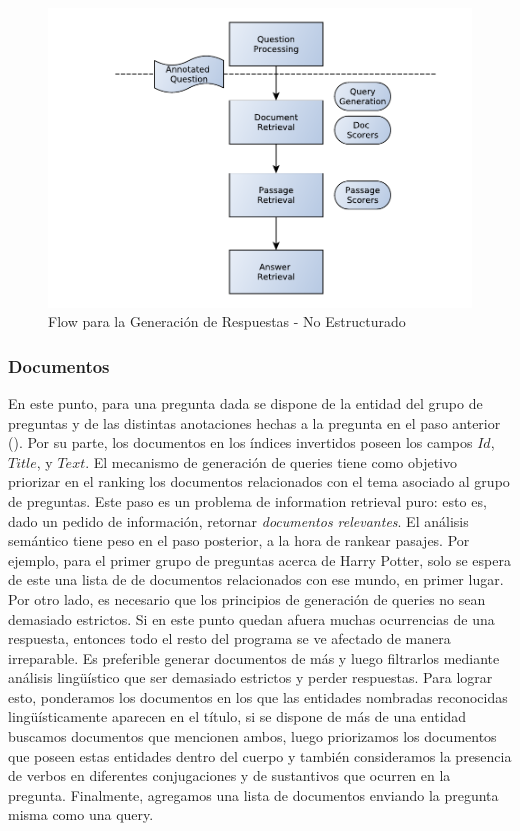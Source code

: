 \begin{figure}[H]
  \centering
    \includegraphics[scale=0.75]{graficos/AnswerRetrievalFlowWiki}
  \caption{Flow para la Generación de Respuestas - No Estructurado}
  \label{fig:AnswerRetrievalFlowWiki}
\end{figure}

\subsubsection{Documentos}
\label{subsec:docs}
En este punto, para una pregunta dada se dispone de la entidad del grupo de preguntas y de las distintas anotaciones hechas a la pregunta en el paso anterior (). Por su parte, los documentos en los índices invertidos poseen los campos $Id$, $Title$, y $Text$. El mecanismo de generación de queries tiene como objetivo priorizar en el ranking los documentos relacionados con el tema asociado al grupo de preguntas. Este paso es un problema de information retrieval puro: esto es, dado un pedido de información, retornar \textit{documentos relevantes}. El análisis semántico tiene peso en el paso posterior, a la hora de rankear pasajes. Por ejemplo, para el primer grupo de preguntas acerca de Harry Potter, solo se espera de este una lista de de documentos relacionados con ese mundo, en primer lugar. Por otro lado, es necesario que los principios de generación de queries no sean demasiado estrictos. Si en este punto quedan afuera muchas ocurrencias de una respuesta, entonces todo el resto del programa se ve afectado de manera irreparable. Es preferible generar documentos de más y luego filtrarlos mediante análisis lingüístico que ser demasiado estrictos y perder respuestas. 
Para lograr esto, ponderamos los documentos en los que las entidades nombradas reconocidas lingüísticamente aparecen en el título, si se dispone de más de una entidad buscamos documentos que mencionen ambos, luego priorizamos los documentos que poseen estas entidades dentro del cuerpo y también consideramos la presencia de verbos en diferentes conjugaciones y de sustantivos que ocurren en la pregunta. Finalmente, agregamos una lista de documentos enviando la pregunta misma como una query.  

